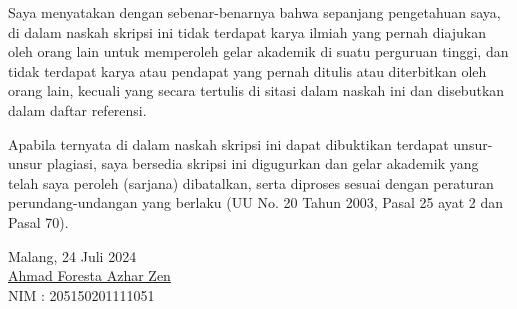 \documentclass{skripsi}
\begin{document}
\cover

\approvalpage

{\orisinalitas

  Saya menyatakan dengan sebenar-benarnya bahwa sepanjang pengetahuan
  saya, di dalam naskah skripsi ini tidak terdapat karya ilmiah yang
  pernah diajukan oleh orang lain untuk memperoleh gelar akademik di
  suatu perguruan tinggi, dan tidak terdapat karya atau pendapat yang
  pernah ditulis atau diterbitkan oleh orang lain, kecuali yang secara
  tertulis di sitasi dalam naskah ini dan disebutkan dalam daftar
  referensi.

  Apabila ternyata di dalam naskah skripsi ini dapat dibuktikan
  terdapat unsur-unsur plagiasi, saya bersedia skripsi ini digugurkan
  dan gelar akademik yang telah saya peroleh (sarjana) dibatalkan,
  serta diproses sesuai dengan peraturan perundang-undangan yang
  berlaku (UU No. 20 Tahun 2003, Pasal 25 ayat 2 dan Pasal 70).
  \vspace{1.5cm}

  \noindent
  \hspace*{9cm}Malang, 24 Juli 2024
  \vspace{2.5cm}   \\
  \hspace*{9cm}\underline{Ahmad Foresta Azhar Zen} \\
  \hspace*{9cm}NIM : 205150201111051
}
\end{document}
